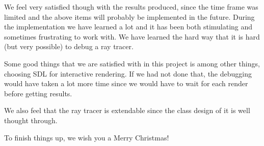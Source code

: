\documentclass[a4paper]{report}
\begin{document}
We feel very satisfied though with the results produced, since the
time frame was limited and the above items will probably be
implemented in the future. During the implementation we have learned a
lot and it has been both stimulating and sometimes frustrating to work
with. We have learned the hard way that it is hard (but very possible)
to debug a ray tracer.

Some good things that we are satisfied with in this project is among
other things, choosing SDL for interactive rendering. If we had not
done that, the debugging would have taken a lot more time since we
would have to wait for each render before getting results.

We also feel that the ray tracer is extendable since the class design
of it is well thought through.

To finish things up, we wish you a Merry Christmas!



\end{document}
